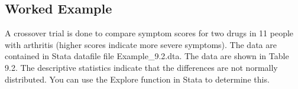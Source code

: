 \documentclass[
]{memoir}
\begin{document}
\hypertarget{worked-example-6}{%
\subsection{Worked Example}\label{worked-example-6}}

A crossover trial is done to compare symptom scores for two drugs in 11 people with arthritis (higher scores indicate more severe symptoms). The data are contained in Stata datafile file Example\_9.2.dta. The data are shown in Table 9.2. The descriptive statistics indicate that the differences are not normally distributed. You can use the Explore function in Stata to determine this.

 
  \providecommand{\huxb}[2]{\arrayrulecolor[RGB]{#1}\global\arrayrulewidth=#2pt}
  \providecommand{\huxvb}[2]{\color[RGB]{#1}\vrule width #2pt}
  \providecommand{\huxtpad}[1]{\rule{0pt}{#1}}
  \providecommand{\huxbpad}[1]{\rule[-#1]{0pt}{#1}}
\end{document}
